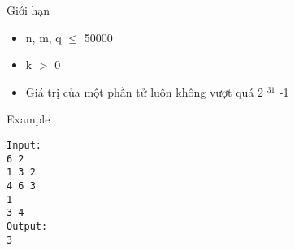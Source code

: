 Giới hạn
\begin{itemize}
	\item     n, m, q  $\le$  50000   
	\item     k $>$ 0   
	\item     Giá trị của một phần tử luôn không vượt quá 2    $^     31    $    -1   
\end{itemize}
Example
\begin{verbatim}
Input:
6 2
1 3 2
4 6 3
1
3 4
Output:
3
\end{verbatim}